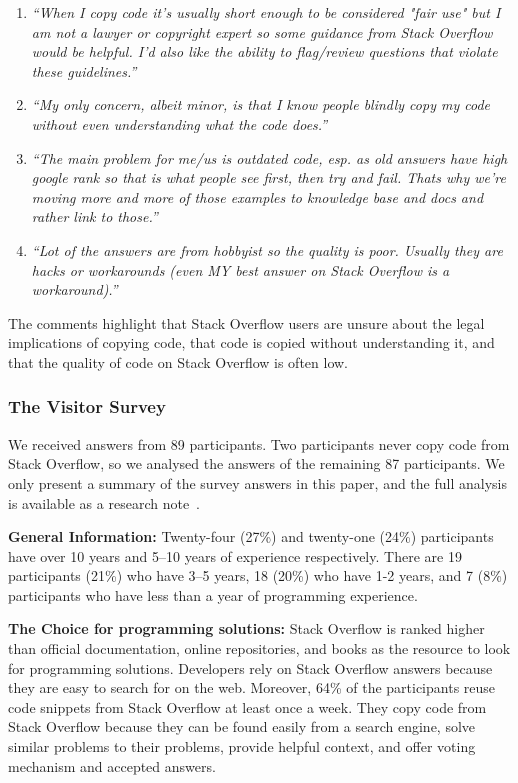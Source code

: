 \documentclass[10pt,journal,compsoc]{IEEEtran}
\begin{document}
\begin{enumerate}
	\item \textit{``When I copy code it's usually short enough to be considered "fair
		use" but I am not a lawyer or copyright expert so some guidance from Stack Overflow would be
		helpful. I'd also like the ability to flag/review questions that violate these
		guidelines.''}
	\item \textit{``My only concern, albeit minor, is that I know people blindly copy
		my code without even understanding what the code does.''}
	\item \textit{``The main problem for me/us is outdated code, esp. as old answers
		have high google rank so that is what people see first, then try and fail. Thats
		why we're moving more and more of those examples to knowledge base and docs and
		rather link to those.''}
	\item \textit{``Lot of the answers are from hobbyist so the quality is poor.
		Usually they are hacks or workarounds (even MY best answer on Stack Overflow is a
		workaround).''}
\end{enumerate}

The comments highlight that Stack Overflow users are unsure about the
legal implications of copying code, that code is copied without
understanding it, and that the quality of code on Stack Overflow is
often low.

\subsubsection{The Visitor Survey}

We received answers from 89 participants. Two participants never copy code from
Stack Overflow, so we analysed the answers of the remaining 87 participants. We
only present a summary of the survey answers in this paper, and the full
analysis is available as a research note~\cite{Ragkhitwetsagul_RN2017}.

\textbf{General Information: }
Twenty-four (27\%) and twenty-one (24\%) participants have over 10 years and 5--10
years of experience respectively. There are 19 participants (21\%) who have 3--5
years, 18 (20\%) who have 1-2 years, and 7 (8\%) participants who have less than a
year of programming experience.

\textbf{The Choice for programming solutions: }
Stack Overflow is ranked higher than official documentation, online
repositories, and books as the resource to look for programming solutions.
Developers rely on Stack Overflow answers because they are easy to search for on
the web. Moreover, 64\% of the participants reuse code snippets from Stack
Overflow at least once a week. They copy code from Stack Overflow because they
can be found easily from a search engine, solve similar problems to their
problems, provide helpful context, and offer voting mechanism and accepted answers. 
\end{document}
